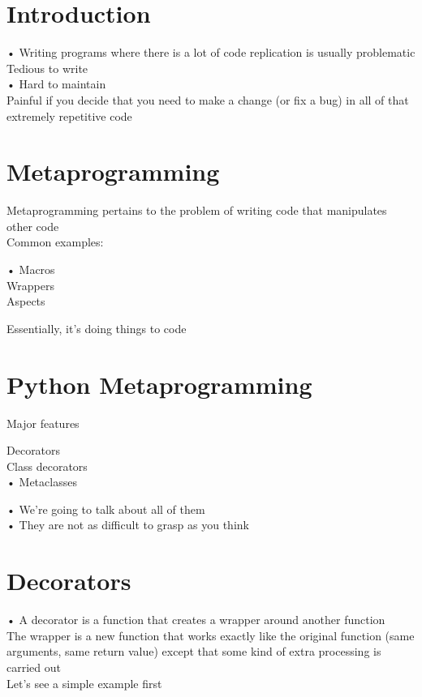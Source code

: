 \documentclass[
  letterpaper,
  DIV=11,
  numbers=noendperiod]{scrreprt}
\begin{document}

\chapter{Introduction}\label{introduction}

• Writing programs where there is a lot of code replication is usually
problematic\\
Tedious to write\\
• Hard to maintain\\
Painful if you decide that you need to make a change (or fix a bug) in
all of that extremely repetitive code


\chapter{Metaprogramming}\label{metaprogramming-1}

Metaprogramming pertains to the problem of writing code that manipulates
other code\\
Common examples:

• Macros\\
Wrappers\\
Aspects

Essentially, it's doing things to code


\chapter{Python Metaprogramming}\label{python-metaprogramming}

Major features

Decorators\\
Class decorators\\
• Metaclasses

• We're going to talk about all of them\\
• They are not as difficult to grasp as you think


\chapter{Decorators}\label{decorators}

• A decorator is a function that creates a wrapper around another
function\\
The wrapper is a new function that works exactly like the original
function (same arguments, same return value) except that some kind of
extra processing is carried out\\
Let's see a simple example first
\end{document}
